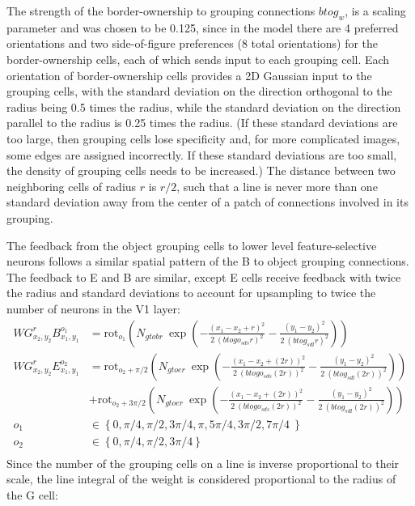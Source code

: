 The strength of the border-ownership to grouping connections $btog_w$,
is a scaling parameter and was chosen to be 0.125, since in the model
there are 4 preferred orientations and two side-of-figure preferences
(8 total orientations)
for the border-ownership cells,
each of which sends input to each grouping cell.
 Each orientation of
border-ownership cells provides a 2D Gaussian input to the grouping
cells, with the standard deviation on the direction orthogonal to the
radius being 0.5 times the radius, while the standard deviation on the
direction parallel to the radius is 0.25 times the radius. (If these
standard deviations are too large, then grouping cells lose
specificity and, for more complicated images, some edges are assigned
incorrectly. If these standard deviations are too small, the density
of grouping cells needs to be increased.) The distance between two
neighboring cells of radius $r$ is $r/2$, such that a line is never
more than one standard deviation away from the center of a patch of
connections involved in its grouping.

The feedback from the object grouping cells to lower level feature-selective neurons follows a similar spatial pattern of the
B to object grouping connections. The feedback to E and B are similar,  except E cells receive feedback with twice the radius and standard deviations to account for upsampling to twice the number of neurons in the V1 layer:
\begin{align}
	WG^{r}_{x_2,y_2}B^{o_1}_{x_1,y_1}&=\text{rot}_{o_1}\left(N_{gtobr}\: \exp\left(-\frac{(x_1-x_2+r)^2}{2\: (btogo_{sds} r)^2}
	-\frac{(y_1-y_2)^2}{2\: (btog_{sdl} r)^2}\right)\right)\ \nonumber\\ 
	WG^{r}_{x_2,y_2}E^{o_2}_{x_1,y_1}&=\text{rot}_{o_2+\pi/2}\left(N_{gtoer}\: \exp\left(-\frac{(x_1-x_2+(2r))^2}{2\: (btogo_{sds} (2r))^2}
		-\frac{(y_1-y_2)^2}{2\: (btog_{sdl} (2r))^2}\right)\right)\nonumber\\
		&+\text{rot}_{o_2+3\pi/2}\left(N_{gtoer}\: \exp\left(-\frac{(x_1-x_2+(2r))^2}{2\: (btogo_{sds} (2r))^2}
				-\frac{(y_1-y_2)^2}{2\: (btog_{sdl} (2r))^2}\right)\right)\ \nonumber\\ o_1&\in \left\{0,\pi/4,\pi/2,3\pi/4,\pi,5\pi/4,3\pi/2,7\pi/4\ \right\} \nonumber\\
		o_2&\in \left\{0,\pi/4,\pi/2,3\pi/4 \right\} \nonumber\\
\end{align}
Since the number of the grouping cells on a line is
inverse proportional to their scale, the line integral of the weight
is considered proportional to the radius of the G cell: 

